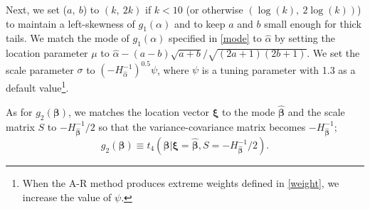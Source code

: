 \documentclass[article]{jss}
\begin{document}
Next, we set ($a,~ b$) to $(k,~ 2k)$ if $k<10$ (or otherwise $(\log(k),~ 2\log(k))$)   to maintain a left-skewness of $g_1(\alpha)$ and to keep  $a$ and $b$ small enough for thick tails. We match the mode of $g_1(\alpha)$ specified in  \eqref{mode} to $\hat{\alpha}$ by setting the location parameter $\mu$ to $\hat{\alpha}-(a-b)\sqrt{a+b}/\sqrt{(2a+1)(2b+1)}$. We set  the scale parameter $\sigma$ to $(-H^{-1}_{\hat{\alpha}})^{0.5}\psi$, where $\psi$ is a tuning parameter with 1.3 as a default value\footnote{When the A-R method produces extreme weights defined in  \eqref{weight}, we increase the value of $\psi$.}.  %

As for $g_2(\boldsymbol{\beta})$, we matches the location vector $\boldsymbol{\xi}$ to the mode $\hat{\boldsymbol{\beta}}$ and the scale matrix $S$ to $-H^{-1}_{\hat{\boldsymbol{\beta}}}/2$ so that the variance-covariance matrix becomes $-H^{-1}_{\hat{\boldsymbol{\beta}}}$;
\begin{equation}
g_2(\boldsymbol{\beta})\equiv t_4(\boldsymbol{\beta}\vert \boldsymbol{\xi}=\hat{\boldsymbol{\beta}}, S=-H^{-1}_{\hat{\boldsymbol{\beta}}}/2).
\end{equation}
\end{document}
